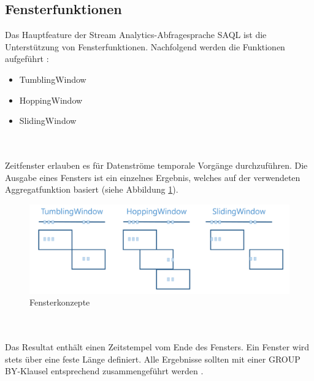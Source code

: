 \subsection{Fensterfunktionen}
Das Hauptfeature der Stream Analytics-Abfragesprache SAQL ist die Unterstützung von Fensterfunktionen. Nachfolgend werden die Funktionen aufgeführt \cite{Prosise.}: 
\begin{itemize} 
	\item TumblingWindow
	\item HoppingWindow
	\item SlidingWindow
\end{itemize}
\\ \\Zeitfenster erlauben es für Datenströme temporale Vorgänge durchzuführen. Die Ausgabe eines Fensters ist ein einzelnes Ergebnis, welches auf der verwendeten Aggregatfunktion basiert (siehe Abbildung \ref{fig:window_concepts}). 
\begin{figure}[H]
	\centering
	\includegraphics[width=1.0\linewidth]{images/fensterfunktionen}
	\caption{Fensterkonzepte \cite{Prosise.}} %
	\label{fig:window_concepts}
\end{figure} 
\\ \\Das Resultat enthält einen Zeitstempel vom Ende des Fensters. Ein Fenster wird stets über eine feste Länge definiert. Alle Ergebnisse sollten mit einer GROUP BY-Klausel entsprechend zusammengeführt werden \cite{Azure.2017}. 
